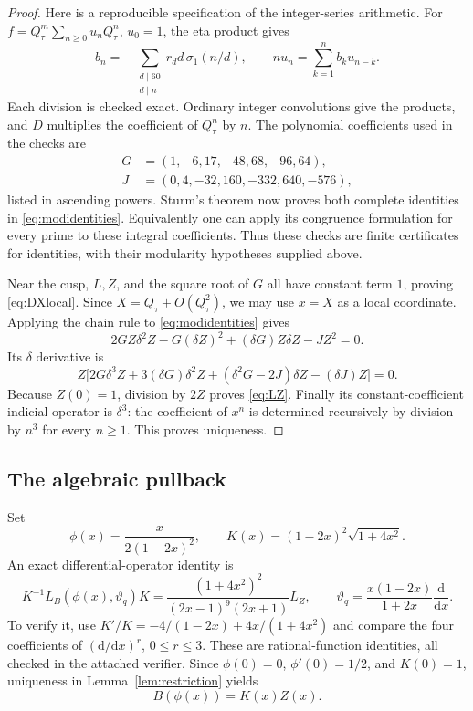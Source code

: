 \documentclass[11pt,a4paper]{article}
\theoremstyle{remark}
\newcommand{\tht}{\vartheta}
\newcommand{\dd}{\mathrm d}
\begin{document}
\begin{proof}
Here is a reproducible specification of the integer-series arithmetic.
For $f=Q_\tau^m\sum_{n\geq0}u_nQ_\tau^n$, $u_0=1$, the eta product
gives
\begin{equation}\label{eq:etarecurrence}
 b_n=-\sum_{\substack{d\mid60\\d\mid n}}r_d d\,\sigma_1(n/d),
 \qquad
 n u_n=\sum_{k=1}^n b_k u_{n-k}.
\end{equation}
Each division is checked exact. Ordinary integer convolutions give the
products, and $D$ multiplies the coefficient of $Q_\tau^n$ by $n$.
The polynomial coefficients used in the checks are
\begin{align*}
 G&=(1,-6,17,-48,68,-96,64),\\
 J&=(0,4,-32,160,-332,640,-576),
\end{align*}
listed in ascending powers. Sturm's theorem now proves both complete
identities in \eqref{eq:modidentities}. Equivalently one can apply its
congruence formulation for every prime to these integral coefficients.
Thus these checks are finite certificates for identities, with their
modularity hypotheses supplied above.

Near the cusp, $L,Z$, and the square root of $G$ all have constant
term $1$, proving \eqref{eq:DXlocal}. Since $X=Q_\tau+O(Q_\tau^2)$,
we may use $x=X$ as a local coordinate. Applying the chain rule to
\eqref{eq:modidentities} gives
\[
 2GZ\delta^2Z-G(\delta Z)^2+(\delta G)Z\delta Z-JZ^2=0.
\]
Its $\delta$ derivative is
\[
 Z\bigl[2G\delta^3Z+3(\delta G)\delta^2Z
             +(\delta^2G-2J)\delta Z-(\delta J)Z\bigr]=0.
\]
Because $Z(0)=1$, division by $2Z$ proves \eqref{eq:LZ}.
Finally its constant-coefficient indicial operator is $\delta^3$:
the coefficient of $x^n$ is determined recursively by division by
$n^3$ for every $n\geq1$. This proves uniqueness.
\end{proof}

\subsection{The algebraic pullback}

Set
\begin{equation}\label{eq:phiK}
 \phi(x)=\frac{x}{2(1-2x)^2},\qquad
 K(x)=(1-2x)^2\sqrt{1+4x^2}.
\end{equation}
An exact differential-operator identity is
\begin{equation}\label{eq:pullback}
 K^{-1}L_B(\phi(x),\tht_q)K
 =\frac{(1+4x^2)^2}{(2x-1)^9(2x+1)}L_Z,
 \qquad \tht_q=\frac{x(1-2x)}{1+2x}\frac{\dd}{\dd x}.
\end{equation}
To verify it, use
$K'/K=-4/(1-2x)+4x/(1+4x^2)$ and compare the four coefficients of
$(\dd/\dd x)^r$, $0\leq r\leq3$. These are rational-function
identities, all checked in the attached verifier. Since
$\phi(0)=0$, $\phi'(0)=1/2$, and $K(0)=1$, uniqueness in
Lemma~\ref{lem:restriction} yields
\begin{equation}\label{eq:BZ}
 B(\phi(x))=K(x)Z(x).
\end{equation}
\end{document}

